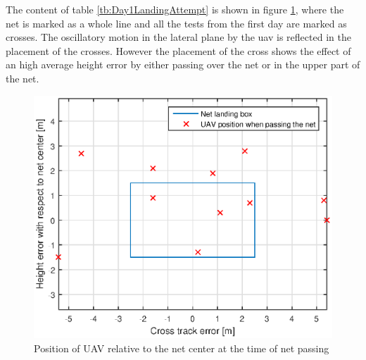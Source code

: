 The content of table \ref{tb:Day1LandingAttempt} is shown in figure \ref{Fig:Day1NetPass}, where the net is marked as a whole line and all the tests from the first day are marked as crosses. The oscillatory motion in the lateral plane by the \gls{uav} is reflected in the placement of the crosses. However the placement of the cross shows the effect of an high average height error by either passing over the net or in the upper part of the net.
\newpage
\begin{figure}[H]
\centering
\includegraphics[scale=0.7]{figs/Experiment/day1NetHit.eps}
\caption{Position of UAV relative to the net center at the time of net passing}
\label{Fig:Day1NetPass}
\end{figure}
